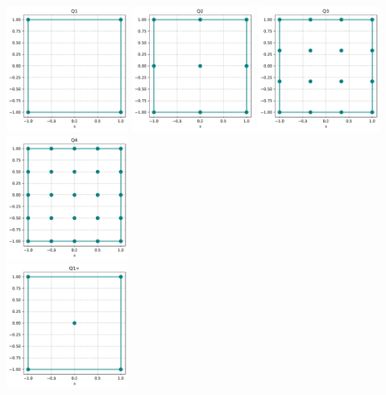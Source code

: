 \begin{center}
\includegraphics[width=4cm]{python_codes/fieldstone_120/spaces/Q1_nodes}
\includegraphics[width=4cm]{python_codes/fieldstone_120/spaces/Q2_nodes}
\includegraphics[width=4cm]{python_codes/fieldstone_120/spaces/Q3_nodes}
\includegraphics[width=4cm]{python_codes/fieldstone_120/spaces/Q4_nodes}\\
\includegraphics[width=4cm]{python_codes/fieldstone_120/spaces/Q1+_nodes}

\end{center}
